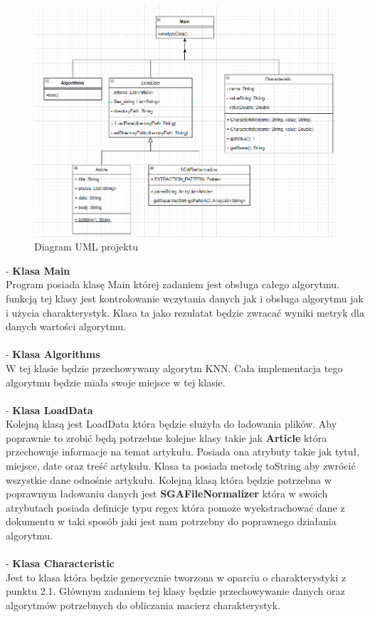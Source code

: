 \documentclass{classrep}
\begin{document}
\begin{figure}[!htbp]
	\centering
     \includegraphics[width=\textwidth]{img/uml.png}
	\caption{Diagram UML projektu}
\end{figure}
\vspace{5px}
\noindent - {\bf Klasa Main}\\
Program posiada klasę Main której zadaniem jest obsługa całego algorytmu. funkcją tej klasy jest kontrolowanie wczytania danych jak i obsługa algorytmu jak i użycia charakterystyk. Klasa ta jako rezulatat będzie zwracać wyniki metryk dla danych wartości algorytmu.\\\\
- {\bf Klasa Algorithms}\\
W tej klasie będzie przechowywany algorytm KNN. Cała implementacja tego algorytmu będzie miała swoje miejsce w tej klasie.\\\\
- {\bf Klasa LoadData}\\
Kolejną klasą jest LoadData która będzie służyła do ładowania plików. Aby poprawnie to zrobić będą potrzebne kolejne klasy takie jak {\bf Article} która przechowuje informacje na temat artykułu. Posiada ona atrybuty takie jak tytuł, miejsce, date oraz treść artykułu. Klasa ta posiada metodę toString aby zwrócić wszystkie dane odnośnie artykułu. Kolejną klasą która będzie potrzebna w poprawnym ładowaniu danych jest {\bf SGAFileNormalizer} która w swoich atrybutach posiada definicje typu regex która pomoże wyekstrachować dane z dokumentu w taki sposób jaki jest nam potrzebny do poprawnego działania algorytmu.\\\\
- {\bf Klasa Characteristic}\\
Jest to klasa która będzie generycznie tworzona w oparciu o charakterystyki z punktu 2.1. Głównym zadaniem tej klasy będzie przechowywanie danych oraz algorytmów potrzebnych do obliczania macierz charakterystyk.
\end{document}
